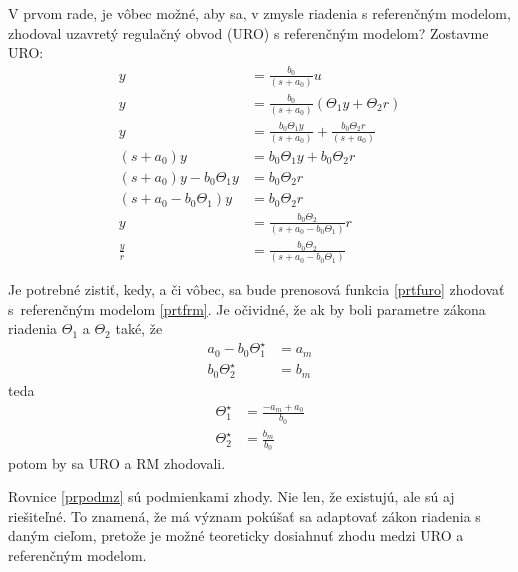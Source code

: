 \documentclass[a4paper, 10pt, ]{article}
\begin{document}
V prvom rade, je vôbec možné, aby sa, v zmysle riadenia s referenčným modelom, zhodoval uzavretý regulačný obvod (URO) s referenčným modelom? Zostavme URO:
\begin{subequations}
    \begin{align}
        y &= \frac{b_0}{\left( s+a_0 \right)} u \\
        y &= \frac{b_0}{\left( s+a_0 \right)} \left( \Theta_1 y + \Theta_2 r \right) \\
        y &= \frac{b_0 \Theta_1 y}{\left( s+a_0 \right)} + \frac{b_0 \Theta_2 r}{\left( s+a_0 \right)} \\
        \left( s+a_0 \right) y &= b_0 \Theta_1 y + b_0 \Theta_2 r \\
        \left( s+a_0 \right) y - b_0 \Theta_1 y &= b_0 \Theta_2 r \\
        \left( s + a_0 - b_0 \Theta_1 \right) y &= b_0 \Theta_2 r \\
        y &= \frac{b_0 \Theta_2}{\left( s + a_0 - b_0 \Theta_1 \right)} r \\
        \frac{y}{r} &= \frac{b_0 \Theta_2}{\left( s + a_0 - b_0 \Theta_1 \right)} \label{prtfuro}
    \end{align}
\end{subequations}

Je potrebné zistiť, kedy, a či vôbec, sa bude prenosová funkcia \eqref{prtfuro} zhodovať s~referenčným modelom \eqref{prtfrm}. Je očividné, že ak by boli parametre zákona riadenia $\Theta_1$ a $\Theta_2$ také, že
\begin{subequations}
    \begin{align}
        a_0 - b_0 \Theta_1^\star &= a_m \\
        b_0 \Theta_2^\star &= b_m
    \end{align}
\end{subequations}
teda
\begin{subequations} \label{prpodmz}
    \begin{align}
        \Theta_1^\star &= \frac{-a_m + a_0}{b_0}  \\
        \Theta_2^\star &= \frac{b_m}{b_0}
    \end{align}
\end{subequations}
potom by sa URO a RM zhodovali.

Rovnice \eqref{prpodmz} sú podmienkami zhody. Nie len, že existujú, ale sú aj riešiteľné. To znamená, že má význam pokúšať sa adaptovať zákon riadenia s daným cieľom, pretože je možné teoreticky dosiahnuť zhodu medzi URO a referenčným modelom.
\end{document}
